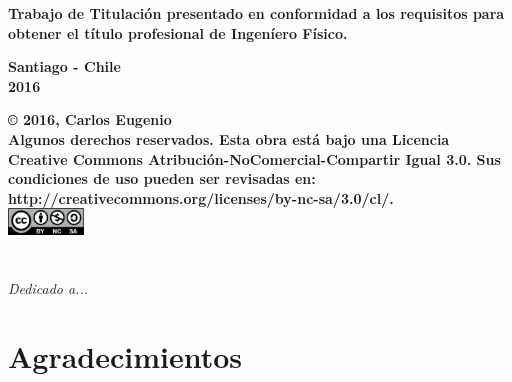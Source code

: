 \documentclass[12pt]{book}
\begin{document}
\begin{titlepage}
\begin{flushright}
  \begin{center}
    \textbf{Trabajo de Titulación presentado en conformidad a los
    requisitos para obtener el título profesional de Ingeníero Físico.}
  \end{center}
  \end{flushright}

\vfill

  \begin{center}
    \textbf{Santiago -  Chile\\2016}
  \end{center}
\end{titlepage}

\newpage
\mbox{}
\thispagestyle{empty}

\vfill
\begin{center}
\textbf{© 2016, Carlos Eugenio\\
Algunos  derechos  reservados. 
Esta  obra  está  bajo  una  Licencia  Creative  Commons  Atribución-NoComercial-Compartir Igual  
3.0. Sus condiciones de uso pueden ser revisadas 
en: http://creativecommons.org/licenses/by-nc-sa/3.0/cl/.}
\\
\includegraphics[width=2cm]{by-nc-sa.png}
\end{center}


\newpage
\chapter*{}
\begin{flushright}
\textit{Dedicado a...}
\end{flushright}
\newpage

\chapter*{Agradecimientos} %
\end{document}
